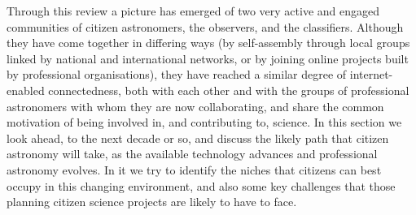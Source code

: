 \documentclass{ar2e}
\begin{document}
% 
%
% 
%
%
% 



Through this review a picture has emerged of two very active and engaged
communities of citizen astronomers, the observers, and the classifiers. 
Although they have come together in differing ways (by self-assembly through
local groups linked by national and international networks, or by joining online
projects built by professional organisations), they have reached a similar
degree of internet-enabled connectedness, both with each other and with the
groups of professional astronomers with whom they are now collaborating, and
share the common motivation of being involved in, and contributing to, science.
In this section we look ahead, to the next decade or so, and discuss the likely
path that citizen astronomy will take, as the available technology advances and
professional astronomy evolves. In it we try to identify the niches that
citizens can best occupy in this changing environment, and also some key
challenges that those planning citizen science projects are likely to have to
face.


\end{document}
